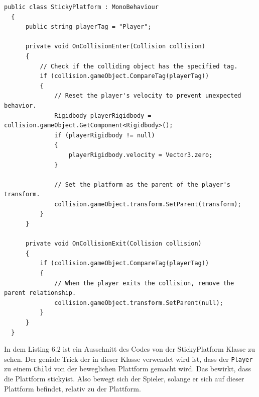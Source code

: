 \begin{lstlisting}[language=CSharp,caption={StickyPlatform Klasse.},label=code:mainmenu]
  public class StickyPlatform : MonoBehaviour
  {
      public string playerTag = "Player";
  
      private void OnCollisionEnter(Collision collision)
      {
          // Check if the colliding object has the specified tag.
          if (collision.gameObject.CompareTag(playerTag))
          {
              // Reset the player's velocity to prevent unexpected behavior.
              Rigidbody playerRigidbody = collision.gameObject.GetComponent<Rigidbody>();
              if (playerRigidbody != null)
              {
                  playerRigidbody.velocity = Vector3.zero;
              }
  
              // Set the platform as the parent of the player's transform.
              collision.gameObject.transform.SetParent(transform);
          }
      }
  
      private void OnCollisionExit(Collision collision)
      {
          if (collision.gameObject.CompareTag(playerTag))
          {
              // When the player exits the collision, remove the parent relationship.
              collision.gameObject.transform.SetParent(null);
          }
      }
  }
\end{lstlisting}

In dem Listing 6.2 ist ein Ausschnitt des Codes von der StickyPlatform Klasse zu sehen. Der geniale Trick der in dieser Klasse verwendet wird ist, dass der \verb+Player+ zu einem \verb+Child+ von der beweglichen Plattform gemacht wird. Das bewirkt, dass die Plattform \glqq sticky\grqq \space ist. Also bewegt sich der Spieler, solange er sich auf dieser Plattform befindet, relativ zu der Plattform.

\pagebreak
